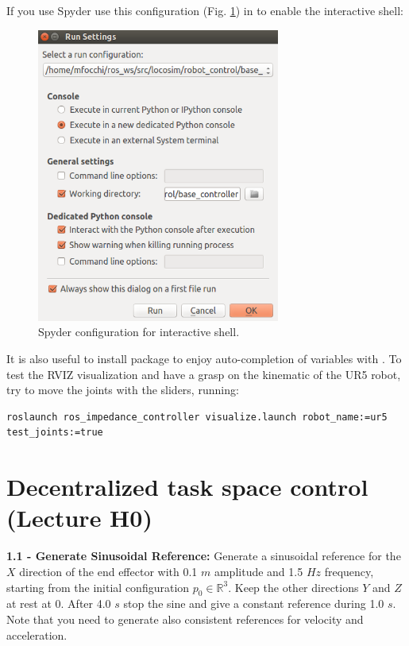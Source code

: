 \documentclass[11pt]{article}
\newcommand{\Rnum}{\mathbb{R}} %
\begin{document}
If you use Spyder use this configuration (Fig. \ref{fig:spyder}) in  to enable the interactive shell:

\begin{figure}[bht]
	\centering
	\includegraphics[width=8cm]{spyderConfig.png}
	\caption{Spyder configuration for interactive shell.}
	\label{fig:spyder}
\end{figure}

It is also useful to install  package to enjoy auto-completion of variables with .
To test the RVIZ visualization and have a grasp on the kinematic of the UR5 robot, try to move the joints with the sliders, running:
%
\begin{verbatim}
roslaunch ros_impedance_controller visualize.launch robot_name:=ur5 test_joints:=true 
\end{verbatim}

\section{Decentralized task space control (Lecture H0)}

\quad

\noindent
\textbf{1.1 - Generate Sinusoidal Reference:}
Generate a sinusoidal reference for the $X$ direction of the end effector with 0.1 $m$  amplitude and 1.5 $Hz$ frequency, starting from the initial configuration $p_0 \in \Rnum^3$. Keep the other directions $Y$ and $Z$ at rest at 0. After 4.0 $s$ stop the sine and give a constant reference during 1.0 $s$. Note that you need to generate also consistent references for velocity and acceleration.
\end{document}
